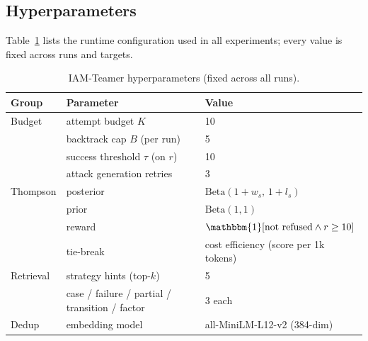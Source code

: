 \subsection{Hyperparameters}
Table~\ref{tab:hyperparams} lists the runtime configuration used in all experiments; every value is fixed across runs and targets.

\begin{table}[htbp]
      \centering
      \caption{IAM-Teamer hyperparameters (fixed across all runs).}
      \label{tab:hyperparams}
      \footnotesize
      \begin{tabular}{@{}lll@{}}
            \toprule
            \textbf{Group} & \textbf{Parameter} & \textbf{Value} \\
            \midrule
            Budget       & attempt budget $K$                             & 10                                                \\
                         & backtrack cap $B$ (per run)                    & 5                                                 \\
                         & success threshold $\tau$ (on $r$)              & 10                                                \\
                         & attack generation retries                      & 3                                                 \\
            \midrule
            Thompson     & posterior                                      & $\text{Beta}(1+w_s,\,1+l_s)$                      \\
                         & prior                                          & $\text{Beta}(1,1)$                                \\
                         & reward                                         & $\mathbbm{1}[\text{not refused} \wedge r \ge 10]$ \\
                         & tie-break                                      & cost efficiency (score per 1k tokens)             \\
            \midrule
            Retrieval    & strategy hints (top-$k$)                       & 5                                                 \\
                         & case / failure / partial / transition / factor & 3 each                                            \\
            \midrule
            Dedup        & embedding model                                & all-MiniLM-L12-v2 (384-dim)                       \\

\end{tabular}
\end{table}
